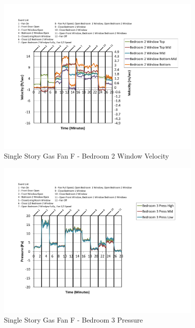 \documentclass{article}
\begin{document}
\begin{appendices}
	\begin{figure}[H]
		\centering
		\includegraphics[height=3.05in,trim=0.67in 1.1in 0.67in 0.8in,clip=true]{0_Images/Results_Charts/ColdFlow/Single_Story/Gas/F/Bedroom_2_Window_Velocity.pdf}
		\caption{Single Story Gas Fan F - Bedroom 2 Window Velocity}
	\end{figure}
 

	\begin{figure}[H]
		\centering
		\includegraphics[height=3.05in,trim=0.67in 1.1in 0.67in 0.8in,clip=true]{0_Images/Results_Charts/ColdFlow/Single_Story/Gas/F/Bedroom_3_Pressure.pdf}
		\caption{Single Story Gas Fan F - Bedroom 3 Pressure}
	\end{figure}
 
	\clearpage


\end{appendices}
\end{document}
